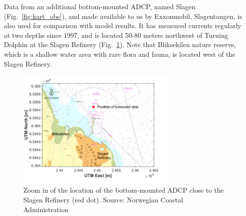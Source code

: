 Data from an additional bottom-mounted ADCP, named Slagen (Fig.~\ref{fig:kart_obs}), and made available to us by Exxonmobil, Slagentangen, is also used for comparison with model results. It has measured currents regularly at two depths since 1997, and is located 50-80 meters northwest of Turning Dolphin at the Slagen Refinery (Fig.~\ref{fig:Slagen-kart}). Note that Bliksekilen nature reserve, which is a shallow water area with rare flora and fauna, is located west of the Slagen Refinery. 



\begin{figure}[htb]
\centerline{
\includegraphics*[trim=0cm 0cm 1cm 0cm,clip=true,width=0.7\textwidth]{Figurer/Slagen_kart}}
\caption{\small Zoom in of the location of the bottom-mounted ADCP close to the Slagen Refinery (red dot). Source: Norwegian Coastal Administration}
\label{fig:Slagen-kart}
\end{figure}

